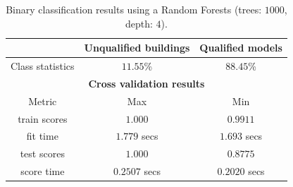 \documentclass[../main.tex]{subfile}
\begin{document}
    \begin{table}[H]
        \caption{\label{tab::binary_rf_1000_4}Binary classification results using a Random Forests (trees: $1000$, depth: $4$).}
        \begin{tabular}{c c c}
            \toprule
             & \textbf{Unqualified buildings} & \textbf{Qualified models} \\
            \midrule
            Class statistics & $11.55$\% & $88.45$\% \\
            \midrule
            \midrule
            \multicolumn{3}{c}{\textbf{Cross validation results}}\\
            \midrule
            Metric & Max & Min \\
             \midrule
            train scores & $1.000$ & $0.9911$ \\
             \midrule
            fit time & $1.779$ secs & $1.693$ secs \\
             \midrule
            test scores & $1.000$ & $0.8775$\\
             \midrule
            score time & $0.2507$ secs & $0.2020$ secs\\
             \bottomrule
        \end{tabular}
    \end{table}
\end{document}
